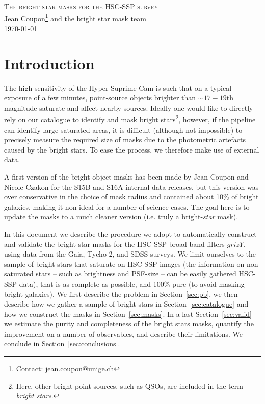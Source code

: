 \documentclass[11pt,a4paper,oneside,final]{scrartcl}
\begin{document}

\begin{center}
\noindent
\textsc{\LARGE{{The bright star masks for the HSC-SSP survey}}}\\
Jean Coupon\footnote{Contact: \url{jean.coupon@unige.ch}} and the bright star mask team\\
\today
\end{center}

\noindent

\section{Introduction}

The high sensitivity of the Hyper-Suprime-Cam is such that on a typical exposure of a few minutes, point-source objects brighter than $\sim17-19$th magnitude saturate and affect nearby sources. Ideally one would like to directly rely on our catalogue to identify and mask bright stars\footnote{Here, other bright point sources, such as QSOs, are included in the term \emph{bright stars}.}, however, if the pipeline can identify large saturated areas, it is difficult (although not impossible) to precisely measure the required size of masks due to the photometric artefacts caused by the bright stars.  To ease the process, we therefore make use of external data.

A first version of the bright-object masks has been made by Jean Coupon and Nicole Czakon for the S15B and S16A internal data releases, but this version was over conservative in the choice of mask radius and contained about 10\% of bright galaxies, making it non ideal for a number of science cases. The goal here is to update the masks to a much cleaner version (i.e. truly a bright-\emph{star} mask).

In this document we describe the procedure we adopt to automatically construct and validate the bright-star masks for the HSC-SSP broad-band filters $grizY$, using data from the Gaia, Tycho-2, and SDSS surveys. We limit ourselves to the sample of bright stars that saturate on HSC-SSP images (the information on non-saturated stars -- such as brightness and PSF-size -- can be easily gathered HSC-SSP data), that is as complete as possible, and 100\% pure (to avoid masking bright galaxies). We first describe the problem in Section~\ref{sec:pb}, we then describe how we gather a sample of bright stars in Section~\ref{sec:catalogue} and how we construct the masks in Section~\ref{sec:masks}. In a last Section~\ref{sec:valid} we estimate the purity and completeness of the bright stars masks, quantify the improvement on a number of observables, and describe their limitations. We conclude in Section~\ref{sec:conclusions}.
\end{document}
